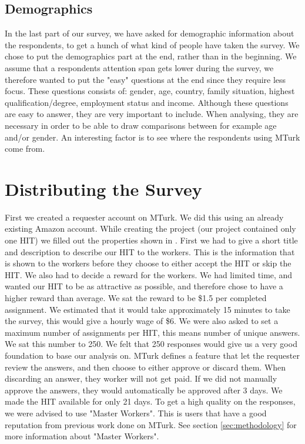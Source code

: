 \subsection{Demographics}
In the last part of our survey, we have asked for demographic information about the respondents, to get a hunch of what kind of people have taken the survey. We chose to put the demographics part at the end, rather than in the beginning. We assume that a respondents attention span gets lower during the survey, we therefore wanted to put the "easy" questions at the end since they require less focus. These questions consists of: gender, age, country, family situation, highest qualification/degree, employment status and income. Although these questions are easy to answer, they are very important to include. When analysing, they are necessary in order to be able to draw comparisons between for example age and/or gender. An interesting factor is to see where the respondents using MTurk come from.  

\section{Distributing the Survey}


First we created a requester account on MTurk. We did this using an already existing Amazon account. While creating the project (our project contained only one HIT) we filled out the properties shown in . First we had to give a short title and description to describe our HIT to the workers. This is the information that is shown to the workers before they choose to either accept the HIT or skip the HIT. We also had to decide a reward for the workers. We had limited time, and wanted our HIT to be as attractive as possible, and therefore chose to have a higher reward than average. We sat the reward to be \$1.5 per completed assignment. We estimated that it would take approximately 15 minutes to take the survey, this would give a hourly wage of \$6. We were also asked to set a maximum number of assignments per HIT, this means number of unique answers. We sat this number to 250. We felt that 250 responses would give us a very good foundation to base our analysis on. MTurk defines a feature that let the requester review the answers, and then choose to either approve or discard them. When discarding an answer, they worker will not get paid. If we did not manually approve the answers, they would automatically be approved after 3 days. We made the HIT available for only 21 days. To get a high quality on the responses, we were advised to use "Master Workers". This is users that have a good reputation from previous work done on MTurk. See section \ref{sec:methodology} for more information about "Master Workers". 

